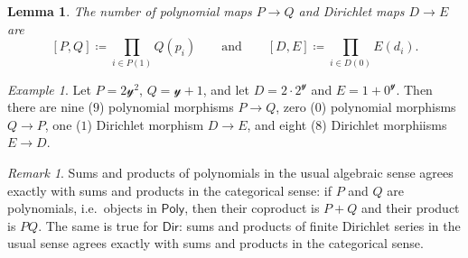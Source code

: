 \documentclass[11pt, article, one side]{memoir}
\theoremstyle{theorem}
\newtheorem{lemma}[equation]{Lemma}
\theoremstyle{definition}
\theoremstyle{remark}
\newtheorem{example}[equation]{Example}
\newtheorem{remark}[equation]{Remark}
\newcommand{\Cat}[1]{\mathsf{#1}}%
\newcommand{\yon}{\mathcal{y}}
\newcommand{\poly}{\Cat{Poly}}
\newcommand{\dir}{\Cat{Dir}}
\newcommand{\qqand}{\qquad\text{and}\qquad}
\begin{document}
\begin{lemma}
The number of polynomial maps $P\to Q$ and Dirichlet maps $D\to E$ are
\[
  [P, Q]\coloneqq\prod_{i\in P(1)}Q(p_i)
  \qqand
  [D, E]\coloneqq\prod_{i\in D(0)}E(d_i).
\]
\end{lemma}

\begin{example}
Let $P=2\yon^2$, $Q=\yon+1$, and let $D=2\cdot2^\yon$ and $E=1+0^\yon$. Then there are nine ($9$) polynomial morphisms $P\to Q$, zero ($0$) polynomial morphisms $Q\to P$, one ($1$) Dirichlet morphism $D\to E$, and eight ($8$) Dirichlet morphiisms $E\to D$.
\end{example}

\begin{remark}\label{rem.products_coproducts}
Sums and products of polynomials in the usual algebraic sense agrees exactly with sums and products in the categorical sense: if $P$ and $Q$ are polynomials, i.e.\ objects in $\poly$, then their coproduct is $P+Q$ and their product is $PQ$. The same is true for $\dir$: sums and products of finite Dirichlet series in the usual sense agrees exactly with sums and products in the categorical sense.
\end{remark}
\end{document}
